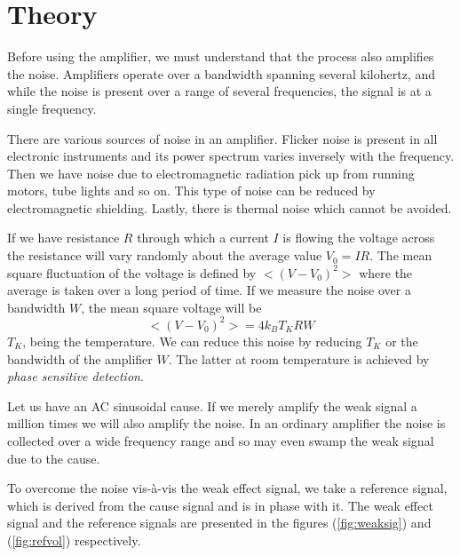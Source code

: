 \documentclass[%
 reprint,
nofootinbib,
 amsmath,amssymb,
 aps,
]{revtex4-2}
\begin{document}
\section{Theory}
    Before using the amplifier, we must understand that the process also amplifies the noise. Amplifiers operate over a bandwidth spanning several kilohertz, and while the noise is present over a range of several frequencies, the signal is at a single frequency.
    \par
    There are various sources of noise in an amplifier. Flicker noise is present in all electronic instruments and its power spectrum varies inversely with the frequency. Then we have noise due to electromagnetic radiation pick up from running motors, tube lights and so on. This type of noise can be reduced by electromagnetic shielding. Lastly, there is thermal noise which cannot be avoided.
    \par
    If we have resistance $R$ through which a current $I$ is flowing the voltage across the resistance will vary randomly about the average value $V_0 = IR$. The mean square fluctuation of the voltage is defined by $< (V-V_0)^2 >$ where the average is taken over a long period of time. If we measure the noise over a bandwidth $W$, the mean square voltage will be
    \begin{equation}
        < (V-V_0)^2 > = 4 k_B T_K R W
    \end{equation}
    $T_K$, being the temperature. We can reduce this noise by reducing $T_K$ or the bandwidth of the amplifier $W$. The latter at room temperature is achieved by \textit{phase sensitive detection}.
    \par
    Let us have an AC sinusoidal cause. If we merely amplify the weak signal a million times we will also amplify the noise. In an ordinary amplifier the noise is collected over a wide frequency range and so may even swamp the weak signal due to the cause.
    \par
    To overcome the noise vis-à-vis the weak effect signal, we take a reference signal, which is derived from the cause signal and is in phase with it. The weak effect signal and the reference signals are presented in the figures (\ref{fig:weaksig}) and (\ref{fig:refvol}) respectively.
\end{document}
